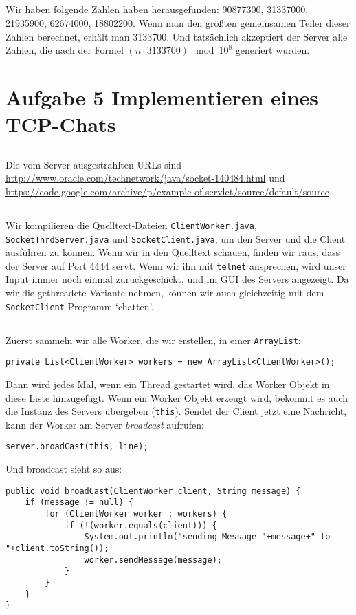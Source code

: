 \documentclass[10pt,a4paper]{article}
\begin{document}
\subsection{}
Wir haben folgende Zahlen haben herausgefunden:
90877300,
31337000,
21935900,
62674000,
18802200.
Wenn man den größten gemeinsamen Teiler dieser Zahlen berechnet,
erhält man 3133700. Und tatsächlich akzeptiert der Server alle Zahlen,
die nach der Formel $(n \cdot 3133700) \mod 10^8$ generiert wurden.

\section{Aufgabe 5 Implementieren eines TCP-Chats}
\setcounter{subsection}{0}
\subsection{}
Die vom Server ausgestrahlten URLs sind
\url{http://www.oracle.com/technetwork/java/socket-140484.html} und
\url{https://code.google.com/archive/p/example-of-servlet/source/default/source}.

\subsection{}
Wir kompilieren die Quelltext-Dateien \texttt{ClientWorker.java},
\texttt{SocketThrdServer.java} und \texttt{SocketClient.java},
um den Server und die Client ausführen zu können.
Wenn wir in den Quelltext schauen, finden wir raus, dass der Server
auf Port 4444 servt. Wenn wir ihn mit \texttt{telnet} ansprechen,
wird unser Input immer noch einmal zurückgeschickt, und im GUI des Servers
angezeigt. Da wir die gethreadete Variante nehmen, können wir auch gleichzeitig
mit dem \texttt{SocketClient} Programm `chatten'.

\subsection{}
Zuerst sammeln wir alle Worker, die wir erstellen, in einer
\texttt{ArrayList}:
\begin{verbatim}
private List<ClientWorker> workers = new ArrayList<ClientWorker>();
\end{verbatim}
Dann wird jedes Mal, wenn ein Thread gestartet wird, das Worker Objekt
in diese Liste hinzugefügt.
Wenn ein Worker Objekt erzeugt wird, bekommt es auch die Instanz
des Servers übergeben (\texttt{this}). Sendet der Client jetzt eine Nachricht,
kann der Worker am Server \textit{broadcast} aufrufen:
\begin{verbatim}
server.broadCast(this, line);
\end{verbatim}
\newpage
Und broadcast sieht so aus:
\begin{verbatim}
public void broadCast(ClientWorker client, String message) {
    if (message != null) {
        for (ClientWorker worker : workers) {
            if (!(worker.equals(client))) {
                System.out.println("sending Message "+message+" to "+client.toString());
                worker.sendMessage(message);
            }
        }
    }
}
\end{verbatim}
\end{document}
